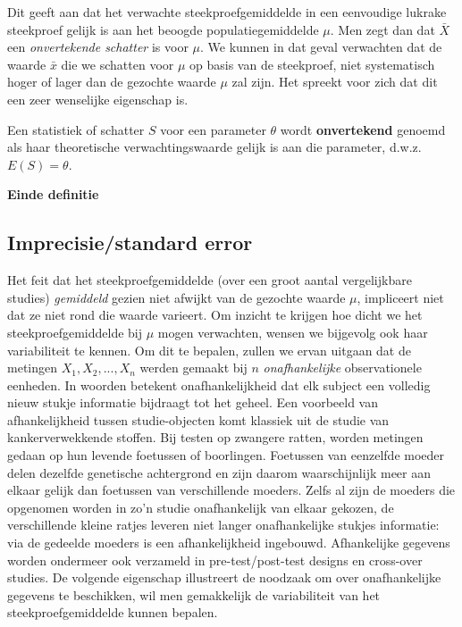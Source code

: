 \documentclass[12pt,dutch,coursenotes]{book}
\theoremstyle{definition}
\theoremstyle{definition}
\theoremstyle{definition}
\theoremstyle{remark}
\let\BeginKnitrBlock\begin \let\EndKnitrBlock\end
\begin{document}
Dit geeft aan dat het verwachte steekproefgemiddelde in een eenvoudige
lukrake steekproef gelijk is aan het beoogde populatiegemiddelde
\(\mu\). Men zegt dan dat \(\bar X\) een \emph{onvertekende schatter} is
voor \(\mu\). We kunnen in dat geval verwachten dat de waarde \(\bar x\)
die we schatten voor \(\mu\) op basis van de steekproef, niet
systematisch hoger of lager dan de gezochte waarde \(\mu\) zal zijn. Het
spreekt voor zich dat dit een zeer wenselijke eigenschap is.

\BeginKnitrBlock{definition}[Onvertekende schatter]
\protect\hypertarget{def:unnamed-chunk-65}{}{\label{def:unnamed-chunk-65}
\iffalse (Onvertekende schatter) \fi{} }Een statistiek of schatter \(S\)
voor een parameter \(\theta\) wordt \textbf{onvertekend} genoemd als
haar theoretische verwachtingswaarde gelijk is aan die parameter, d.w.z.
\(E(S)= \theta\).

\textbf{Einde definitie}
\EndKnitrBlock{definition}

\subsection{Imprecisie/standard error}\label{imprecisiestandard-error}

Het feit dat het steekproefgemiddelde (over een groot aantal
vergelijkbare studies) \emph{gemiddeld} gezien niet afwijkt van de
gezochte waarde \(\mu\), impliceert niet dat ze niet rond die waarde
varieert. Om inzicht te krijgen hoe dicht we het steekproefgemiddelde
bij \(\mu\) mogen verwachten, wensen we bijgevolg ook haar variabiliteit
te kennen. Om dit te bepalen, zullen we ervan uitgaan dat de metingen
\(X_1, X_2, ..., X_n\) werden gemaakt bij \(n\) \emph{onafhankelijke}
observationele eenheden. In woorden betekent onafhankelijkheid dat elk
subject een volledig nieuw stukje informatie bijdraagt tot het geheel.
Een voorbeeld van afhankelijkheid tussen studie-objecten komt klassiek
uit de studie van kankerverwekkende stoffen. Bij testen op zwangere
ratten, worden metingen gedaan op hun levende foetussen of boorlingen.
Foetussen van eenzelfde moeder delen dezelfde genetische achtergrond en
zijn daarom waarschijnlijk meer aan elkaar gelijk dan foetussen van
verschillende moeders. Zelfs al zijn de moeders die opgenomen worden in
zo'n studie onafhankelijk van elkaar gekozen, de verschillende kleine
ratjes leveren niet langer onafhankelijke stukjes informatie: via de
gedeelde moeders is een afhankelijkheid ingebouwd. Afhankelijke gegevens
worden ondermeer ook verzameld in pre-test/post-test designs en
cross-over studies. De volgende eigenschap illustreert de noodzaak om
over onafhankelijke gegevens te beschikken, wil men gemakkelijk de
variabiliteit van het steekproefgemiddelde kunnen bepalen.
\end{document}

